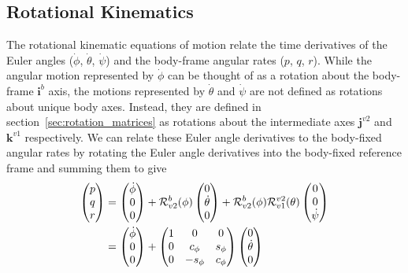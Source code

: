{\subsection{Rotational Kinematics} 
The rotational kinematic equations of motion relate the time derivatives of the Euler angles ($\dot{\phi}$, $\dot{\theta}$, $\dot{\psi}$) and the body-frame angular rates ($p$, $q$, $r$). While the angular motion represented by $\dot{\phi}$ can be thought of as a rotation about the body-frame $\mathbf{i}^b$ axis, the motions represented by $\dot{\theta}$ and $\dot{\psi}$ are not defined as rotations about unique body axes. Instead, they are defined in section~\ref{sec:rotation_matrices} as rotations about the intermediate axes $\mathbf{j}^{v2}$ and $\mathbf{k}^{v1}$ respectively. We can relate these Euler angle derivatives to the body-fixed angular rates by rotating the Euler angle derivatives into the body-fixed reference frame and summing them to give
\begin{align}
\begin{pmatrix} p \\ q \\ r \end{pmatrix} &=
\begin{pmatrix} \dot{\phi} \\ 0 \\ 0
\end{pmatrix}
+ \mathcal{R}_{v2}^{b}(\phi) \begin{pmatrix} 0 \\ \dot{\theta} \\
0 \end{pmatrix} + \mathcal{R}_{v2}^{b}(\phi) \mathcal{R}_{v1}^{v2}(\theta)
    \begin{pmatrix} 0 \\ 0 \\ \dot{\psi} \end{pmatrix}  \notag \\
&= \begin{pmatrix} \dot{\phi} \\ 0 \\ 0 \end{pmatrix}
+ \begin{pmatrix}
    1 & 0 & 0 \\
    0 & c_{\phi} & s_{\phi} \\
    0 & -s_{\phi} & c_{\phi}
  \end{pmatrix}
  \begin{pmatrix} 0 \\ \dot{\theta} \\ 0 \end{pmatrix}

\end{align}}
